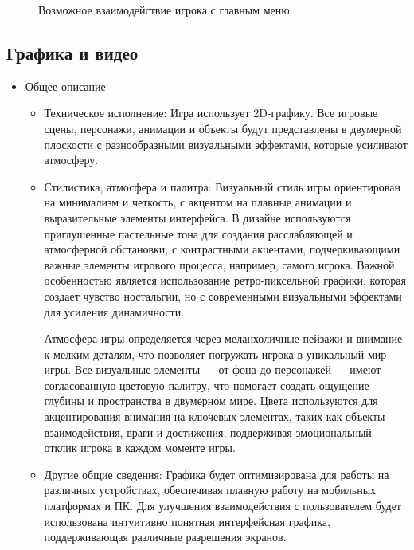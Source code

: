\documentclass{article}
\begin{document}
\begin{figure}[h]
    \caption{Возможное взаимодействие игрока с главным меню}
    \label{ris:image}
\end{figure}

\subsection{Графика и видео}

\begin{itemize}
    \item Общее описание
    \begin{itemize}
        \item Техническое исполнение:
        Игра использует 2D-графику. Все игровые сцены, персонажи, анимации и объекты будут представлены в двумерной плоскости с разнообразными визуальными эффектами, которые усиливают атмосферу.
        \item Стилистика, атмосфера и палитра:
        Визуальный стиль игры ориентирован на минимализм и четкость, с акцентом на плавные анимации и выразительные элементы интерфейса. В дизайне используются приглушенные пастельные тона для создания расслабляющей и атмосферной обстановки, с контрастными акцентами, подчеркивающими важные элементы игрового процесса, например, самого игрока. Важной особенностью является использование ретро-пиксельной графики, которая создает чувство ностальгии, но с современными визуальными эффектами для усиления динамичности.
        
        Атмосфера игры определяется через меланхоличные пейзажи и внимание к мелким деталям, что позволяет погружать игрока в уникальный мир игры. Все визуальные элементы — от фона до персонажей — имеют согласованную цветовую палитру, что помогает создать ощущение глубины и пространства в двумерном мире. Цвета используются для акцентирования внимания на ключевых элементах, таких как объекты взаимодействия, враги и достижения, поддерживая эмоциональный отклик игрока в каждом моменте игры.
        \item Другие общие сведения:
        Графика будет оптимизирована для работы на различных устройствах, обеспечивая плавную работу на мобильных платформах и ПК. Для улучшения взаимодействия с пользователем будет использована интуитивно понятная интерфейсная графика, поддерживающая различные разрешения экранов. 
    \end{itemize}


\end{itemize}
\end{document}
